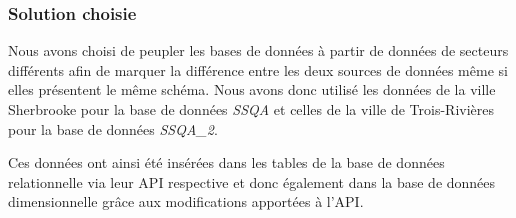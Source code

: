 \documentclass{article}
\begin{document}
\subsubsection*{Solution choisie}
Nous avons choisi de peupler les bases de données à partir de données de secteurs
différents afin de marquer la différence entre les deux sources de données même si
elles présentent le même schéma. Nous avons donc utilisé les données de la ville
Sherbrooke pour la base de données \textit{SSQA} et celles de la ville de Trois-Rivières
pour la base de données \textit{SSQA\_2}.

Ces données ont ainsi été insérées dans les tables de la base de données relationnelle
via leur API respective et donc également dans la base de données dimensionnelle grâce
aux modifications apportées à l'API.
\end{document}
